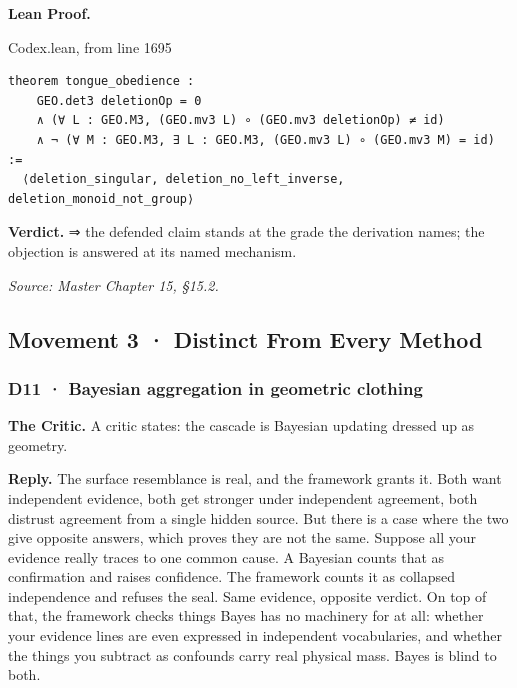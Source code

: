 \documentclass[10pt,twocolumn]{article}
\begin{document}
\textbf{Lean Proof.}

\begin{leanexcerpt}{Codex.lean, from line 1695}
\begin{lstlisting}[style=leanx,firstnumber=1695]
theorem tongue_obedience :
    GEO.det3 deletionOp = 0
    ∧ (∀ L : GEO.M3, (GEO.mv3 L) ∘ (GEO.mv3 deletionOp) ≠ id)
    ∧ ¬ (∀ M : GEO.M3, ∃ L : GEO.M3, (GEO.mv3 L) ∘ (GEO.mv3 M) = id) :=
  ⟨deletion_singular, deletion_no_left_inverse, deletion_monoid_not_group⟩
\end{lstlisting}
\end{leanexcerpt}

\textbf{Verdict.} ⇒ the defended claim stands at the grade the
derivation names; the objection is answered at its named mechanism.

\emph{Source: Master Chapter 15, §15.2.}

\hypertarget{movement-3-distinct-from-every-method}{%
\subsection{Movement 3 · Distinct From Every
Method}\label{movement-3-distinct-from-every-method}}

\hypertarget{d11-bayesian-aggregation-in-geometric-clothing}{%
\subsubsection{D11 · Bayesian aggregation in geometric
clothing}\label{d11-bayesian-aggregation-in-geometric-clothing}}

\textbf{The Critic.} A critic states: the cascade is Bayesian updating
dressed up as geometry.

\textbf{Reply.} The surface resemblance is real, and the framework
grants it. Both want independent evidence, both get stronger under
independent agreement, both distrust agreement from a single hidden
source. But there is a case where the two give opposite answers, which
proves they are not the same. Suppose all your evidence really traces to
one common cause. A Bayesian counts that as confirmation and raises
confidence. The framework counts it as collapsed independence and
refuses the seal. Same evidence, opposite verdict. On top of that, the
framework checks things Bayes has no machinery for at all: whether your
evidence lines are even expressed in independent vocabularies, and
whether the things you subtract as confounds carry real physical mass.
Bayes is blind to both.
\end{document}
